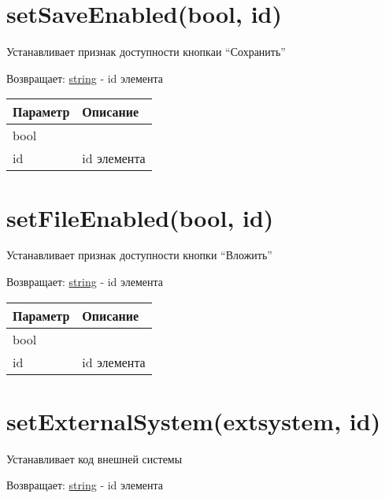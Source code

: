 \hypertarget{setsaveenabledbool-id-string}{%
\section{setSaveEnabled(bool, id)}\label{setsaveenabledbool-id-string}}

Устанавливает признак доступности кнопкаи ``Сохранить''

Возвращает: \protect\hyperlink{string}{string} - id элемента

\begin{longtable}[]{@{}ll@{}}
\toprule
Параметр & Описание\tabularnewline
\midrule
\endhead
bool &\tabularnewline
id & id элемента\tabularnewline
\bottomrule
\end{longtable}

\hypertarget{setfileenabledbool-id-string}{%
\section{setFileEnabled(bool, id)}\label{setfileenabledbool-id-string}}

Устанавливает признак доступности кнопки ``Вложить''

Возвращает: \protect\hyperlink{string}{string} - id элемента

\begin{longtable}[]{@{}ll@{}}
\toprule
Параметр & Описание\tabularnewline
\midrule
\endhead
bool &\tabularnewline
id & id элемента\tabularnewline
\bottomrule
\end{longtable}

\hypertarget{setexternalsystemextsystem-id-string}{%
\section{setExternalSystem(extsystem, id)}\label{setexternalsystemextsystem-id-string}}

Устанавливает код внешней системы

Возвращает: \protect\hyperlink{string}{string} - id элемента

